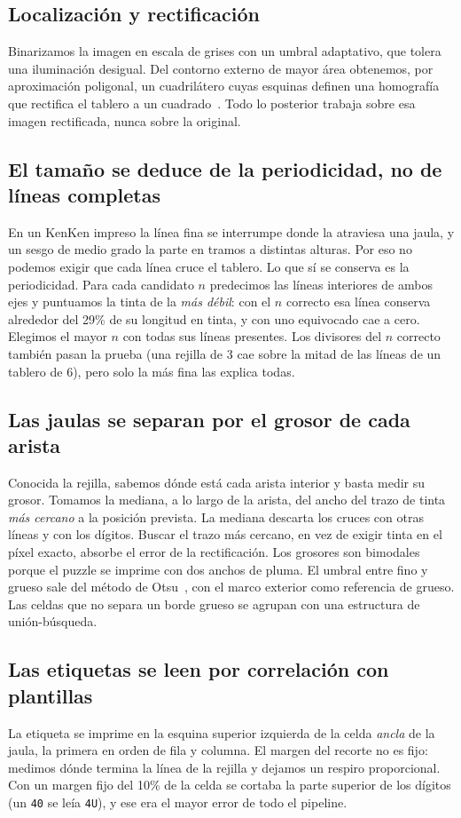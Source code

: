 \documentclass[conference]{IEEEtran}
\begin{document}
\subsection{Localización y rectificación}
Binarizamos la imagen en escala de grises con un umbral adaptativo, que tolera una iluminación desigual. Del contorno externo de mayor área obtenemos, por aproximación poligonal, un cuadrilátero cuyas esquinas definen una homografía que rectifica el tablero a un cuadrado~\cite{opencv}. Todo lo posterior trabaja sobre esa imagen rectificada, nunca sobre la original.

\subsection{El tamaño se deduce de la periodicidad, no de líneas completas}
En un KenKen impreso la línea fina se interrumpe donde la atraviesa una jaula, y un sesgo de medio grado la parte en tramos a distintas alturas. Por eso no podemos exigir que cada línea cruce el tablero. Lo que sí se conserva es la periodicidad. Para cada candidato $n$ predecimos las líneas interiores de ambos ejes y puntuamos la tinta de la \emph{más débil}: con el $n$ correcto esa línea conserva alrededor del 29\% de su longitud en tinta, y con uno equivocado cae a cero. Elegimos el mayor $n$ con todas sus líneas presentes. Los divisores del $n$ correcto también pasan la prueba (una rejilla de 3 cae sobre la mitad de las líneas de un tablero de 6), pero solo la más fina las explica todas.

\subsection{Las jaulas se separan por el grosor de cada arista}
Conocida la rejilla, sabemos dónde está cada arista interior y basta medir su grosor. Tomamos la mediana, a lo largo de la arista, del ancho del trazo de tinta \emph{más cercano} a la posición prevista. La mediana descarta los cruces con otras líneas y con los dígitos. Buscar el trazo más cercano, en vez de exigir tinta en el píxel exacto, absorbe el error de la rectificación. Los grosores son bimodales porque el puzzle se imprime con dos anchos de pluma. El umbral entre fino y grueso sale del método de Otsu~\cite{otsu}, con el marco exterior como referencia de grueso. Las celdas que no separa un borde grueso se agrupan con una estructura de unión-búsqueda.

\subsection{Las etiquetas se leen por correlación con plantillas}
La etiqueta se imprime en la esquina superior izquierda de la celda \emph{ancla} de la jaula, la primera en orden de fila y columna. El margen del recorte no es fijo: medimos dónde termina la línea de la rejilla y dejamos un respiro proporcional. Con un margen fijo del 10\% de la celda se cortaba la parte superior de los dígitos (un \texttt{40} se leía \texttt{4U}), y ese era el mayor error de todo el pipeline.
\end{document}
